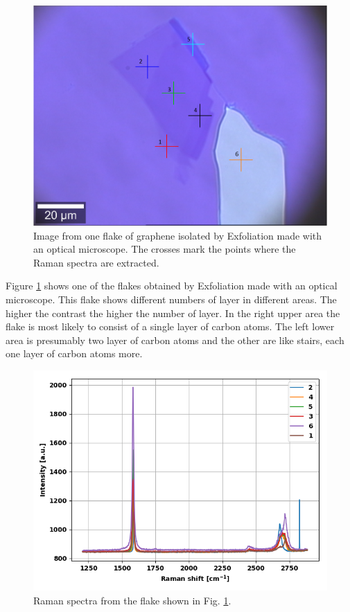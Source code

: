 \documentclass[%
 reprint,
amsmath,amssymb,
pra,
]{revtex4-1}
\begin{document}
\begin{figure}
\centering
\includegraphics[scale=0.35]{Bilder/Exfoliation/mono_bi_tri_flake.PNG}
\caption{Image from one flake of graphene isolated by Exfoliation made with an optical microscope. The crosses mark the points where the Raman spectra are extracted.}
\label{fig:Exfoliation_Microscope}
\end{figure}

Figure \ref{fig:Exfoliation_Microscope} shows one of the flakes obtained by Exfoliation made with an optical microscope. This flake shows different numbers of layer in different areas. The higher the contrast the higher the number of layer. In the right upper area the flake is most likely to consist of a single layer of carbon atoms. The left lower area is presumably two layer of carbon atoms and the other are like stairs, each one layer of carbon atoms more.

\begin{figure}
\centering
\includegraphics[scale=0.5]{Bilder/Exfoliation/2_mono_bi_tri_flake_all.PNG}
\caption{Raman spectra from the flake shown in Fig. \ref{fig:Exfoliation_Microscope}.}
\label{fig:Exfoliation_Spectra}
\end{figure}
\end{document}
